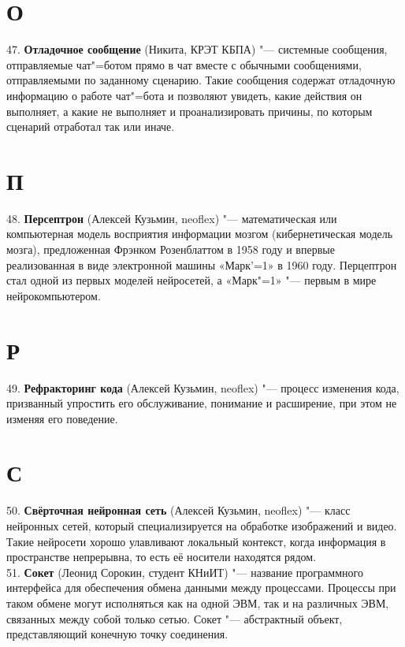 \documentclass[14 pt]{extarticle}
\begin{document}
\section*{О}
    47. \textbf{Отладочное сообщение} (Никита, КРЭТ КБПА)  "--- системные сообщения, отправляемые чат"=ботом прямо в чат вместе с обычными сообщениями, отправляемыми по заданному сценарию. Такие сообщения содержат отладочную информацию о работе чат"=бота и позволяют увидеть, какие действия он выполняет, а какие не выполняет и проанализировать причины, по которым сценарий отработал так или иначе. \\
    
\section*{П}
    48. \textbf{Персептрон} (Алексей Кузьмин, neoflex) "--- математическая или компьютерная модель восприятия информации мозгом (кибернетическая модель мозга), предложенная Фрэнком Розенблаттом в 1958 году и впервые реализованная в виде электронной машины «Марк'=1» в 1960 году. Перцептрон стал одной из первых моделей нейросетей, а «Марк"=1» "--- первым в мире нейрокомпьютером. \\
    
\section*{Р}
    49. \textbf{Рефракторинг кода} (Алексей Кузьмин, neoflex) "--- процесс изменения кода, призванный упростить его обслуживание, понимание и расширение, при этом не изменяя его поведение. \\
    
\section*{С}
    50. \textbf{Свёрточная нейронная сеть} (Алексей Кузьмин, neoflex) "--- класс нейронных сетей, который специализируется на обработке изображений и видео. Такие нейросети хорошо улавливают локальный контекст, когда информация в пространстве непрерывна, то есть её носители находятся рядом. \\
    
    51. \textbf{Сокет} (Леонид Сорокин, студент КНиИТ) "--- название программного интерфейса для обеспечения обмена данными между процессами. Процессы при таком обмене могут исполняться как на одной ЭВМ, так и на различных ЭВМ, связанных между собой только сетью. Сокет "--- абстрактный объект, представляющий конечную точку соединения. \\
    
\end{document}
